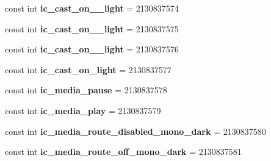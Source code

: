 \begin{DoxyCompactItemize}
\item 
\hypertarget{classClient_1_1Droid_1_1Resource_1_1Drawable_a8e0ae37cada1ff993a8652eec09f024a}{}const int {\bfseries ic\+\_\+cast\+\_\+on\+\_\+\_\+light} = 2130837574\label{classClient_1_1Droid_1_1Resource_1_1Drawable_a8e0ae37cada1ff993a8652eec09f024a}

\item 
\hypertarget{classClient_1_1Droid_1_1Resource_1_1Drawable_a441e6bcefc70bc5ce5c0ba625b2e6475}{}const int {\bfseries ic\+\_\+cast\+\_\+on\+\_\+\_\+light} = 2130837575\label{classClient_1_1Droid_1_1Resource_1_1Drawable_a441e6bcefc70bc5ce5c0ba625b2e6475}

\item 
\hypertarget{classClient_1_1Droid_1_1Resource_1_1Drawable_a14e9a4e6c300bf0441569e307e32c1d3}{}const int {\bfseries ic\+\_\+cast\+\_\+on\+\_\+\_\+light} = 2130837576\label{classClient_1_1Droid_1_1Resource_1_1Drawable_a14e9a4e6c300bf0441569e307e32c1d3}

\item 
\hypertarget{classClient_1_1Droid_1_1Resource_1_1Drawable_af760d024ca0ae3599c52504ce8a7ffea}{}const int {\bfseries ic\+\_\+cast\+\_\+on\+\_\+light} = 2130837577\label{classClient_1_1Droid_1_1Resource_1_1Drawable_af760d024ca0ae3599c52504ce8a7ffea}

\item 
\hypertarget{classClient_1_1Droid_1_1Resource_1_1Drawable_a791b34e919c371c82d18204a4746a710}{}const int {\bfseries ic\+\_\+media\+\_\+pause} = 2130837578\label{classClient_1_1Droid_1_1Resource_1_1Drawable_a791b34e919c371c82d18204a4746a710}

\item 
\hypertarget{classClient_1_1Droid_1_1Resource_1_1Drawable_ae761de045ffc55e3d7766f365b7cb8ff}{}const int {\bfseries ic\+\_\+media\+\_\+play} = 2130837579\label{classClient_1_1Droid_1_1Resource_1_1Drawable_ae761de045ffc55e3d7766f365b7cb8ff}

\item 
\hypertarget{classClient_1_1Droid_1_1Resource_1_1Drawable_a5c7cd30c2065a2278e5bdc08a27608f4}{}const int {\bfseries ic\+\_\+media\+\_\+route\+\_\+disabled\+\_\+mono\+\_\+dark} = 2130837580\label{classClient_1_1Droid_1_1Resource_1_1Drawable_a5c7cd30c2065a2278e5bdc08a27608f4}

\item 
\hypertarget{classClient_1_1Droid_1_1Resource_1_1Drawable_af3cf903c4f547de7cc215b3ff569605a}{}const int {\bfseries ic\+\_\+media\+\_\+route\+\_\+off\+\_\+mono\+\_\+dark} = 2130837581\label{classClient_1_1Droid_1_1Resource_1_1Drawable_af3cf903c4f547de7cc215b3ff569605a}


\end{DoxyCompactItemize}
